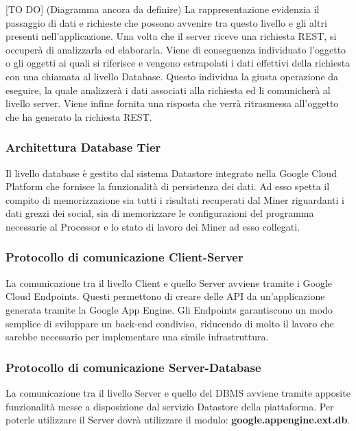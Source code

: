 		[TO DO] (Diagramma ancora da definire) \newline \newline
		[TO REVIEW] \newline
		La rappresentazione evidenzia il passaggio di dati e richieste che possono avvenire tra questo livello e gli altri presenti nell'applicazione.
		Una volta che il server riceve una richiesta REST, si occuperà di analizzarla ed elaborarla. Viene di conseguenza individuato l’oggetto o gli oggetti ai quali si riferisce e vengono estrapolati i dati effettivi della richiesta con una chiamata al livello Database. Questo individua la giusta operazione da eseguire, la quale analizzerà i dati associati alla richiesta ed li comunicherà al livello server. Viene infine fornita una risposta che verrà ritrasmessa all'oggetto che ha generato la richiesta REST.

		\subsubsection{Architettura Database Tier}
		Il livello database è gestito dal sistema Datastore integrato nella Google Cloud Platform che fornisce la funzionalità di persistenza dei dati. Ad esso spetta il compito di memorizzazione sia tutti i risultati recuperati dal Miner riguardanti i dati grezzi dei social, sia di memorizzare le configurazioni del programma necessarie al Processor e lo stato di lavoro dei Miner ad esso collegati.

		\subsubsection{Protocollo di comunicazione Client-Server}
		La comunicazione tra il livello Client e quello Server avviene tramite i Google Cloud Endpoints. Questi permettono di creare delle API da un'applicazione generata tramite la Google App Engine. Gli Endpoints garantiscono un modo semplice di sviluppare un back-end condiviso, riducendo di molto il lavoro che sarebbe necessario per implementare una simile infrastruttura. 


		\subsubsection{Protocollo di comunicazione Server-Database}
		La comunicazione tra il livello Server e quello del DBMS avviene tramite apposite funzionalità messe a disposizione dal servizio Datastore della piattaforma. Per poterle utilizzare il Server dovrà utilizzare il modulo: \textbf{google.appengine.ext.db}.


